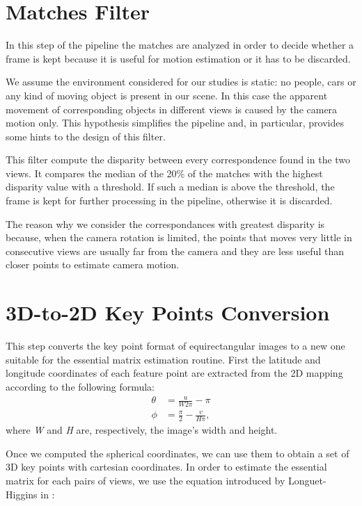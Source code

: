 \section{Matches Filter}
In this step of the pipeline the matches are analyzed in order to decide 
whether a frame is kept because it is useful for motion estimation or 
it has to be discarded.

We assume the environment considered for our studies is static: no people, 
cars or any kind of moving object is present in our scene. In this case the 
apparent movement of corresponding objects in different views is caused by 
the camera motion only. This hypothesis simplifies the pipeline and, 
in particular, provides some hints to the design of this filter.

This filter compute the disparity between every correspondence found in the 
two views. It compares the median of the 20\% of the matches with the highest 
disparity value with a threshold. If such a median is above 
the threshold, the frame is kept for further processing in the pipeline, 
otherwise it is discarded.

The reason why we consider the correspondances with greatest disparity is 
because, when the camera rotation is limited, the points that moves very little 
in consecutive views are usually far from the camera and they are less
useful than closer points to estimate camera motion. 

\section{3D-to-2D Key Points Conversion}
This step converts the key point format of equirectangular images to a new one 
suitable for the essential matrix estimation routine.
First the latitude and longitude coordinates of each feature point are 
extracted from the 2D mapping according to the following formula:
%
\begin{align}
\label{eq:llConversion}
\theta &= \frac{u}{W 2 \pi} - \pi \\
\phi &= \frac{\pi}{2} - \frac{v}{H \pi}\text{,}
\end{align}
%
\noindent where \textit{W} and \textit{H} are, respectively, 
the image's width and height.

Once we computed the spherical coordinates, we can use them to obtain a set of 3D 
key points with cartesian coordinates. In order to estimate the essential 
matrix for each pairs of views, we use the equation introduced by 
Longuet-Higgins in \cite{longuet1981computer}:

